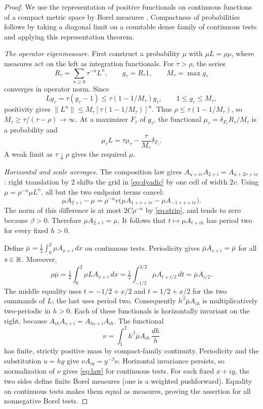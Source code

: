 \begin{proof}
We use the representation of positive functionals on continuous
functions of a compact metric space by Borel measures
\cite[Theorem 7.2]{Folland}.
Compactness of probabilities follows by taking a diagonal limit on
a countable dense family of continuous tests and applying this
representation theorem.

\emph{The operator eigenmeasure.} First construct a probability \(\mu\) with \(\mu L=\rho\mu\),
where measures act on the left as integration functionals.
For \(\tau>\rho\), the series
\[
 R_\tau=\sum_{n\ge0}\tau^{-n}L^n,\qquad
 g_\tau=R_\tau1,\qquad M_\tau=\max g_\tau
\]
converges in operator norm. Since
\[
 Lg_\tau=\tau(g_\tau-1)
 \le\tau(1-1/M_\tau)g_\tau,\qquad 1\le g_\tau\le M_\tau,
\]
positivity gives
\(\|L^n\|\le M_\tau[\tau(1-1/M_\tau)]^n\).
Thus \(\rho\le\tau(1-1/M_\tau)\), so
\(M_\tau\ge\tau/(\tau-\rho)\to\infty\).
At a maximizer \(F_\tau\) of \(g_\tau\), the functional
\(\mu_\tau=\delta_{F_\tau}R_\tau/M_\tau\) is a probability and
\[
 \mu_\tau L=\tau\mu_\tau-\frac{\tau}{M_\tau}\delta_{F_\tau}.
\]
A weak limit as \(\tau\downarrow\rho\) gives the required \(\mu\).

\emph{Horizontal and scale averages.} The composition law gives
\(A_{u+iv}A_{2+i}=A_{u+2v+iv}\): right translation by \(2\)
shifts the grid in \eqref{eq:dyadic} by one cell of width \(2v\).
Using \(\mu=\rho^{-n}\mu L^n\), all but the two endpoint terms cancel:
\[
 \mu A_{2+i}-\mu
 =\rho^{-n}v\bigl(\mu A_{1+v+iv}-\mu A_{-1+v+iv}\bigr).
\]
The norm of this difference is at most \(2C\rho^{-n}\) by
\eqref{eq:strip}, and tends to zero because \(\beta>0\).
Therefore \(\mu A_{2+i}=\mu\).
It follows that \(t\mapsto\mu A_{t+ih}\) has period two for every
fixed \(h>0\).

Define
\(\bar\mu=\tfrac12\int_0^2\mu A_{x+i}\,dx\) on continuous tests.
Periodicity gives \(\bar\mu A_{s+i}=\bar\mu\) for all \(s\in\mathbb R\).
Moreover,
\[
 \rho\bar\mu
 =\tfrac12\int_0^2\mu L A_{x+i}\,dx
 =\tfrac12\int_{-1/2}^{3/2}\mu A_{t+i/2}\,dt
 =\bar\mu A_{i/2}.
\]
The middle equality uses \(t=-1/2+x/2\) and \(t=1/2+x/2\)
for the two summands of \(L\); the last uses period two.
Consequently \(h^\beta\bar\mu A_{ih}\) is multiplicatively
two-periodic in \(h>0\).
Each of these functionals is horizontally invariant on the right,
because \(A_{ih}A_{s+i}=A_{hs+i}A_{ih}\).
The functional
\[
 \nu=\int_1^2 h^\beta\bar\mu A_{ih}\,\frac{dh}{h}
\]
has finite, strictly positive mass by compact-family continuity.
Periodicity and the substitution \(u=hy\) give
\(\nu A_{iy}=y^{-\beta}\nu\). Horizontal invariance persists,
so normalization of \(\nu\) gives \eqref{eq:law} for continuous tests.
For each fixed \(x+iy\), the two sides define finite Borel measures
(one is a weighted pushforward). Equality on continuous tests makes
them equal as measures, proving the assertion for all nonnegative
Borel tests.
\end{proof}


